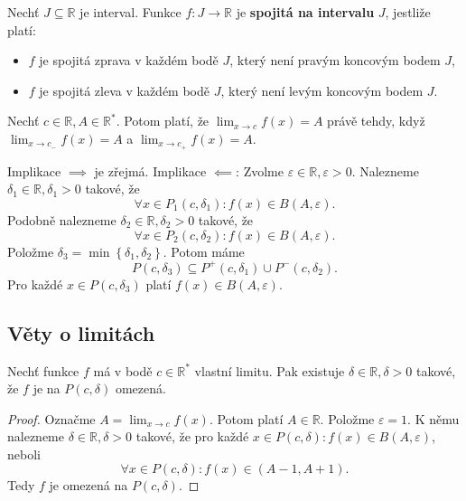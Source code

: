 \begin{definice}
Nechť $J \subseteq \mathbb{R}$ je interval. Funkce $f \colon J \to \mathbb{R}$
je \textbf{spojitá na intervalu} $J$, jestliže platí:
\begin{itemize}
  \item $f$ je spojitá zprava v každém bodě $J$, který není pravým koncovým bodem $J$,
  \item $f$ je spojitá zleva v každém bodě $J$, který není levým koncovým bodem $J$.
\end{itemize}
\end{definice}

\begin{poznamka}
	Nechť $c\in \mathbb R , A\in \mathbb R ^*$. Potom platí, že $\lim_{x\to c}f(x)=A$ právě tehdy,
	když $\lim_{x\to c_-}f(x)=A$ a $\lim_{x\to c_+}f(x)=A$.
	\par Implikace $\implies$ je zřejmá. Implikace $\impliedby$: Zvolme $\varepsilon \in \mathbb R ,\varepsilon > 0$.
	Nalezneme $\delta _1\in \mathbb R , \delta_1 >0$ takové, že
	$$
	    \forall x\in P_1(c,\delta_1) : f(x)\in B(A,\varepsilon).
	$$
	Podobně nalezneme $\delta_2\in \mathbb R , \delta_2 >0$ takové, že
	$$
	    \forall x\in P_2(c,\delta_2):f(x)\in B(A,\varepsilon).
	$$
	Položme $\delta_3=\min \left \{ \delta_1, \delta_2 \right \} $. Potom máme
	$$
	    P(c,\delta_3) \subseteq P^+(c,\delta_1) \cup P^-(c,\delta_2).
	$$
	Pro každé $x \in P(c,\delta_3)$ platí $f(x)\in B(A,\varepsilon)$.
\end{poznamka}

\subsection{Věty o limitách}
\begin{veta}\label{veta3.2}
	Nechť funkce $f$ má v bodě $c\in \mathbb R ^*$ vlastní limitu. Pak existuje
	$\delta\in \mathbb R ,\delta >0$ takové, že $f$ je na $P(c,\delta)$ omezená.
\end{veta}

\begin{proof}
	Označme $A=\lim_{x\to c}f(x)$. Potom platí $A\in \mathbb R $. Položme $\varepsilon =1$. K němu
	nalezneme $\delta\in \mathbb R ,\delta > 0$ takové, že pro každé $x\in P(c,\delta): f(x)\in B(A,\varepsilon)$,
	neboli
	$$
	    \forall x \in P(c,\delta):f(x)\in(A-1, A+1).
	$$
	Tedy $f$ je omezená na $P(c,\delta)$.
\end{proof}

